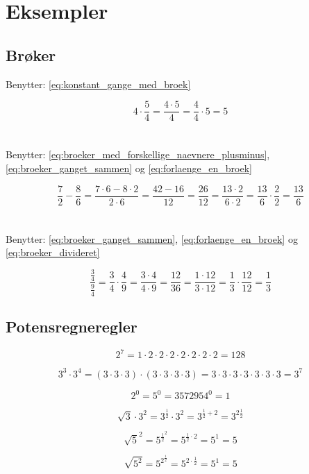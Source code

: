 \documentclass[11pt,a5paper,fleqn,leqno]{book}
\begin{document}
\chapter{Eksempler}

\newpage

\section{Brøker}

Benytter: \eqref{eq:konstant_gange_med_broek}

\[4 \cdot \frac{5}{4} = \frac{4 \cdot 5}{4} = \frac{4}{4} \cdot 5 = 5\]
\\
\\
Benytter: \eqref{eq:broeker_med_forskellige_naevnere_plusminus}, \eqref{eq:broeker_ganget_sammen} og \eqref{eq:forlaenge_en_broek}

\[\frac{7}{2} - \frac{8}{6} = \frac{7 \cdot 6 - 8 \cdot 2}{2 \cdot 6} = \frac{42 - 16}{12} = \frac{26}{12} = \frac{13 \cdot 2}{6 \cdot 2} = \frac{13}{6} \cdot \frac{2}{2} = \frac{13}{6}\]
\\
\\
Benytter: \eqref{eq:broeker_ganget_sammen}, \eqref{eq:forlaenge_en_broek} og \eqref{eq:broeker_divideret}

\[\frac{\frac{3}{4}}{\frac{9}{4}} = \frac{3}{4} \cdot \frac{4}{9} = \frac{3 \cdot 4}{4 \cdot 9} = \frac{12}{36} = \frac{1 \cdot 12}{3 \cdot 12} = \frac{1}{3} \cdot \frac{12}{12} = \frac{1}{3}\]

\section{Potensregneregler}

\[2^7 = 1 \cdot 2 \cdot 2 \cdot 2 \cdot 2 \cdot 2 \cdot 2 \cdot 2 = 128\]

\[3^3 \cdot 3^4 = (3 \cdot 3 \cdot 3) \cdot (3 \cdot 3 \cdot 3 \cdot 3) = 3 \cdot 3 \cdot 3 \cdot 3 \cdot 3 \cdot 3 \cdot 3 = 3^7\]

\[2^0 = 5^0 = 3572954^0 = 1\]

\[\sqrt{3} \cdot 3^2 = 3^{\frac{1}{2}} \cdot 3^2 = 3^{\frac{1}{2}+2} = 3^{2\frac{1}{2}}\]

\[\sqrt{5}^2 = 5^{\frac{1}{2}^2} = 5^{\frac{1}{2} \cdot 2} = 5^1 = 5\]

\[\sqrt{5^2} = 5^{2^{\frac{1}{2}}} = 5^{2 \cdot \frac{1}{2}} = 5^1 = 5\]
\end{document}
